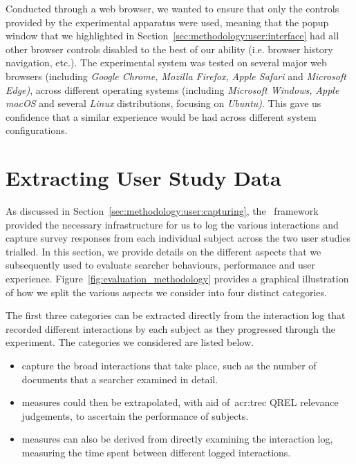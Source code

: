 Conducted through a web browser, we wanted to ensure that only the controls provided by the experimental apparatus were used, meaning that the popup window that we highlighted in Section~\ref{sec:methodology:user:interface} had all other browser controls disabled to the best of our ability (i.e. browser history navigation, etc.). The experimental system was tested on several major web browsers (including \emph{Google Chrome, Mozilla Firefox,} \emph{Apple Safari} and \emph{Microsoft Edge)}, across different operating systems (including \emph{Microsoft Windows,} \emph{Apple macOS} and several \emph{Linux} distributions, focusing on \emph{Ubuntu)}. This gave us confidence that a similar experience would be had across different system configurations.

\section{Extracting User Study Data}\label{sec:methodology:extracting}
As discussed in Section~\ref{sec:methodology:user:capturing}, the \treconomics~framework provided the necessary infrastructure for us to log the various interactions and capture survey responses from each individual subject across the two user studies trialled. In this section, we provide details on the different aspects that we subsequently used to evaluate searcher behaviours, performance and user experience. Figure~\ref{fig:evaluation_methodology} provides a graphical illustration of how we split the various aspects we consider into four distinct categories.

The first three categories can be extracted directly from the interaction log that recorded different interactions by each subject as they progressed through the experiment. The categories we considered are listed below.

\begin{itemize}
    
    \item{ capture the broad interactions that take place, such as the number of documents that a searcher examined in detail.}
    \item{ measures could then be extrapolated, with aid of~\gls{acr:trec} QREL relevance judgements, to ascertain the performance of subjects.}
    \item{ measures can also be derived from directly examining the interaction log, measuring the time spent between different logged interactions.}
    
\end{itemize}

